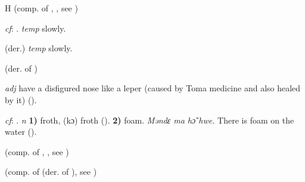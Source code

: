 \begin{letter}{H}
 (comp. of , , see ) 

 \textit{cf}: . \textit{temp} slowly.

 (der.) \textit{temp} slowly.

 (der. of ) 

 \textit{adj} have a disfigured nose like a leper (caused by Toma medicine and also healed by it) (\citealt{Pichl1967}).

 \textit{cf}: . \textit{n} \textbf{1)} froth, (kɔ) froth (\citealt{Pichl1967}). \textbf{2)} foam. \textit{Məndɛ ma hɔ̃ hwe.} There is foam on the water (\citealt{Pichl1967}). 

 (comp. of , , see )

 (comp. of  (der. of ), see ) 


\end{letter}


